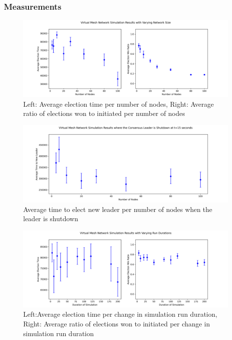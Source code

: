\subsubsection{Measurements}

\begin{figure}[H]
    \centering
    \includegraphics[width=0.9\columnwidth]{images/virtual_vary_nodes.png}
    \caption{Left: Average election time per number of nodes, Right: Average ratio of elections won to initiated per number of nodes}
    \label{fig:virtual_vary_nodes}
\end{figure}


\begin{figure}[H]
    \centering
    \includegraphics[width=0.9\columnwidth]{images/virtual_vary_leader_kill.png}
    \caption{Average time to elect new leader per number of nodes when the leader is shutdown}
    \label{fig:virtual_vary_leader_kill}
\end{figure}


\begin{figure}[H]
    \centering
    \includegraphics[width=0.9\columnwidth]{images/virtual_vary_duration.png}
    \caption{Left:Average election time per change in simulation run duration, Right: Average ratio of elections won to initiated per change in simulation run duration}
    \label{fig:virtual_vary_duration}
\end{figure}


